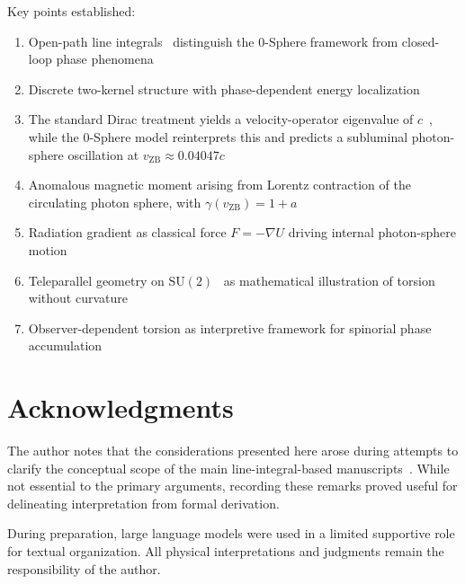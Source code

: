 \documentclass[12pt,letterpaper]{article}
\begin{document}
Key points established:
\begin{enumerate}
\item Open-path line integrals~\cite{hanamura18203433} distinguish the 0-Sphere framework from closed-loop phase phenomena~\cite{ABEffect,Berry1984,WilsonLoop}
\item Discrete two-kernel structure with phase-dependent energy localization~\cite{hanamura16759284,hanamura18356895}
\item The standard Dirac treatment yields a velocity-operator eigenvalue of $c$~\cite{Dirac1928}, while the 0-Sphere model reinterprets this and predicts a subluminal photon-sphere oscillation at $v_{\mathrm{ZB}} \approx 0.04047c$~\cite{hanamura17760132,hanamura18356895}
\item Anomalous magnetic moment arising from Lorentz contraction of the circulating photon sphere, with $\gamma(v_{\mathrm{ZB}}) = 1 + a$~\cite{hanamura17765409}
\item Radiation gradient as classical force $F = -\nabla U$ driving internal photon-sphere motion~\cite{hanamura18356895}
\item Teleparallel geometry on $\mathrm{SU}(2)$~\cite{Weitzenbock1923,Aldrovandi2013} as mathematical illustration of torsion without curvature
\item Observer-dependent torsion as interpretive framework for spinorial phase accumulation~\cite{hanamura18067760,hanamura18135855,hanamura18203433}
\end{enumerate}


\section*{Acknowledgments}

The author notes that the considerations presented here arose during attempts to clarify the conceptual scope of the main line-integral-based manuscripts~\cite{hanamura18067760,hanamura18135855,hanamura18203433}. While not essential to the primary arguments, recording these remarks proved useful for delineating interpretation from formal derivation.

During preparation, large language models were used in a limited supportive role for textual organization. All physical interpretations and judgments remain the responsibility of the author.
\end{document}
